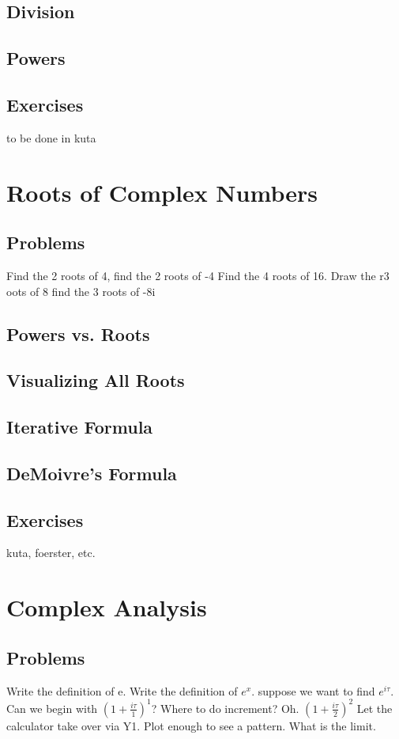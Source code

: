 \subsection{Division}
\subsection{Powers}
\newpage
\subsection{Exercises}
to be done in kuta


\newpage
\section{Roots of Complex Numbers}
\subsection{Problems}
Find the 2 roots of 4, find the 2 roots of -4
Find the 4 roots of 16.  Draw the r3 oots of 8
find the 3 roots of -8i
\newpage
\subsection{Powers vs. Roots}
\subsection{Visualizing All Roots}
\subsection{Iterative Formula}
\subsection{DeMoivre's Formula}
\newpage
\subsection{Exercises}
kuta, foerster, etc.


\newpage
\section{Complex Analysis}
\subsection{Problems}
Write the definition of e.  Write the definition of $e^x$.  suppose we want to find
$e^{i\tau}$.  Can we begin with $(1+\frac{i\tau}{1})^1$?  Where to do increment?
Oh.  $(1+\frac{i\tau}{2})^2$  Let the calculator take over via Y1.  Plot enough to see a
pattern.  What is the limit. 
\newpage

\newpage
